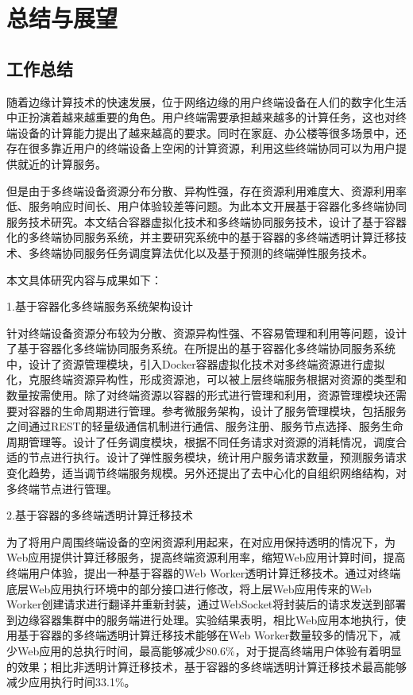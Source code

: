 \chapter{总结与展望 }\label{chap:summary_and_future_work}

\section{工作总结}

随着边缘计算技术的快速发展，位于网络边缘的用户终端设备在人们的数字化生活中正扮演着越来越重要的角色。用户终端需要承担越来越多的计算任务，这也对终端设备的计算能力提出了越来越高的要求。同时在家庭、办公楼等很多场景中，还存在很多靠近用户的终端设备上空闲的计算资源，利用这些终端协同可以为用户提供就近的计算服务。

但是由于多终端设备资源分布分散、异构性强，存在资源利用难度大、资源利用率低、服务响应时间长、用户体验较差等问题。为此本文开展基于容器化多终端协同服务技术研究。本文结合容器虚拟化技术和多终端协同服务技术，设计了基于容器化的多终端协同服务系统，并主要研究系统中的基于容器的多终端透明计算迁移技术、多终端协同服务任务调度算法优化以及基于预测的终端弹性服务技术。

本文具体研究内容与成果如下：

1.基于容器化多终端服务系统架构设计

针对终端设备资源分布较为分散、资源异构性强、不容易管理和利用等问题，设计了基于容器化多终端协同服务系统。在所提出的基于容器化多终端协同服务系统中，设计了资源管理模块，引入Docker容器虚拟化技术对多终端资源进行虚拟化，克服终端资源异构性，形成资源池，可以被上层终端服务根据对资源的类型和数量按需使用。除了对终端资源以容器的形式进行管理和利用，资源管理模块还需要对容器的生命周期进行管理。参考微服务架构，设计了服务管理模块，包括服务之间通过REST的轻量级通信机制进行通信、服务注册、服务节点选择、服务生命周期管理等。设计了任务调度模块，根据不同任务请求对资源的消耗情况，调度合适的节点进行执行。设计了弹性服务模块，统计用户服务请求数量，预测服务请求变化趋势，适当调节终端服务规模。另外还提出了去中心化的自组织网络结构，对多终端节点进行管理。

2.基于容器的多终端透明计算迁移技术

为了将用户周围终端设备的空闲资源利用起来，在对应用保持透明的情况下，为Web应用提供计算迁移服务，提高终端资源利用率，缩短Web应用计算时间，提高终端用户体验，提出一种基于容器的Web Worker透明计算迁移技术。通过对终端底层Web应用执行环境中的部分接口进行修改，将上层Web应用传来的Web Worker创建请求进行翻译并重新封装，通过WebSocket将封装后的请求发送到部署到边缘容器集群中的服务端进行处理。实验结果表明，相比Web应用本地执行，使用基于容器的多终端透明计算迁移技术能够在Web Worker数量较多的情况下，减少Web应用的总执行时间，最高能够减少80.6\%，对于提高终端用户体验有着明显的效果；相比非透明计算迁移技术，基于容器的多终端透明计算迁移技术最高能够减少应用执行时间33.1\%。

